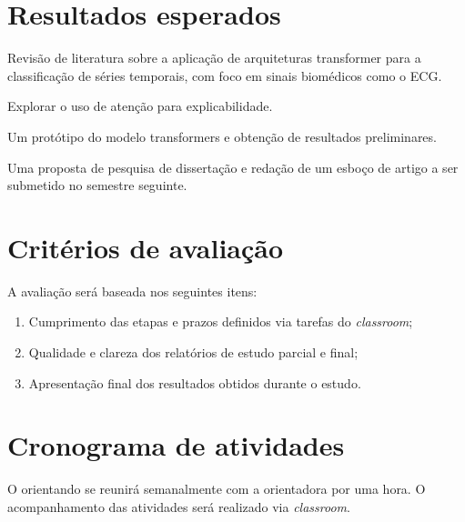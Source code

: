 \documentclass[12pt]{article}
\begin{document}
\section{Resultados esperados} 

Revisão de literatura sobre a aplicação de arquiteturas transformer para a classificação de séries temporais, com foco em sinais biomédicos como o ECG.

Explorar o uso de atenção para explicabilidade.

Um protótipo do modelo transformers e obtenção de resultados preliminares.

Uma proposta de pesquisa de dissertação e redação de um esboço de artigo a ser submetido no semestre seguinte.

\section{Critérios de avaliação} 

A avaliação será baseada nos seguintes itens:
\begin{enumerate}   

\item Cumprimento das etapas e prazos definidos via tarefas do \textit{classroom}; 
\item Qualidade e clareza dos relatórios de estudo parcial e final; 
\item Apresentação final dos resultados obtidos durante o estudo.
\end{enumerate}

\section{Cronograma de atividades}

O orientando se reunirá semanalmente com a orientadora por uma hora. O acompanhamento das atividades será realizado via \textit{classroom}.
\end{document}
